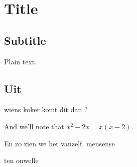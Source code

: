 \documentclass{article}
\begin{document}
\section{Title}

\subsection{Subtitle}

Plain text. 

\subsection{Uit}

wiens koker komt dit dan ?


And we'll note that $x^2 - 2 x = x ( x-2 )$.

En zo zien we het vanzelf, mensense

ten onwelle
\end{document}
